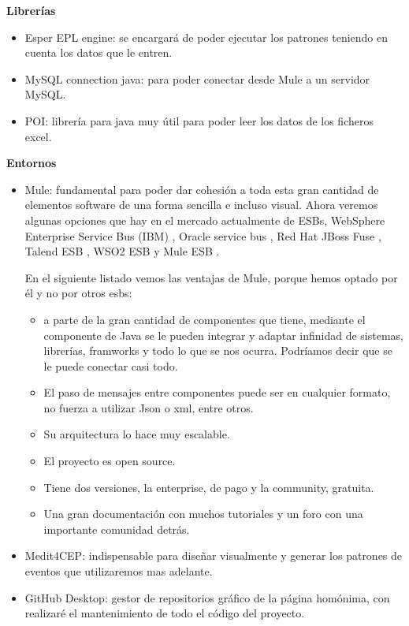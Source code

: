\documentclass[a4paper]{article}
\begin{document}
\textbf{Librerías}
\begin{itemize}
\item Esper EPL engine: se encargará de poder ejecutar los patrones teniendo en cuenta los datos que le entren.
\item MySQL connection java: para poder conectar desde Mule a un servidor MySQL.
\item POI: librería para java muy útil para poder leer los datos de los ficheros excel.
\end{itemize}

\textbf{Entornos}
\begin{itemize}
\item Mule: fundamental para poder dar cohesión a toda esta gran cantidad de elementos software de una forma sencilla e incluso visual. Ahora veremos algunas opciones que hay en el mercado actualmente de ESBs, WebSphere Enterprise Service Bus (IBM) \cite{webWebSphere}, Oracle service bus \cite{webOracleBus}, Red Hat JBoss Fuse \cite{webJBoss}, Talend ESB \cite{webTalend}, WSO2 ESB \cite{webWso2} y Mule ESB \cite{webMule}.

      En el siguiente listado vemos las ventajas de Mule, porque hemos optado por él y no por otros esbs:
      \begin{itemize}
      \item a parte de la gran cantidad de componentes que tiene, mediante el componente de Java se le pueden integrar y adaptar infinidad de sistemas, librerías, framworks y todo lo que se nos ocurra. Podríamos decir que se le puede conectar casi todo.
      \item El paso de mensajes entre componentes puede ser en cualquier formato, no fuerza a utilizar Json o xml, entre otros.
      \item Su arquitectura lo hace muy escalable.
      \item El proyecto es open source.
      \item Tiene dos versiones, la enterprise, de pago y la community, gratuita.
      \item Una gran documentación con muchos tutoriales y un foro con una importante comunidad detrás.
      \end{itemize}
\item Medit4CEP\cite{BOUBETAPUIG201597}: indispensable para diseñar visualmente y generar los patrones de eventos que utilizaremos mas adelante.
\item GitHub Desktop: gestor de repositorios gráfico de la página homónima, con realizaré el mantenimiento de todo el código del proyecto.
\end{itemize}
\end{document}
